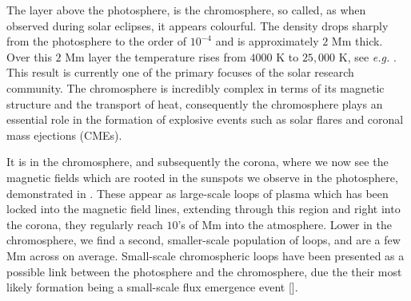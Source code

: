 The layer above the photosphere, is the chromosphere, so called, as when observed during solar eclipses, it appears colourful.
The density drops sharply from the photosphere to the order of $10^{-4}$ and is approximately $2$ Mm thick. 
Over this $2$ Mm layer the temperature rises from $4000$ K to $25,000$ K, see \emph{e.g.} \cite{Withrobe1977}.
This result is currently one of the primary focuses of the solar research community.
The chromosphere is incredibly complex in terms of its magnetic structure and the transport of heat, consequently the chromosphere plays an essential role in the formation of explosive events such as solar flares and coronal mass ejections (CMEs).

It is in the chromosphere, and subsequently the corona, where we now see the magnetic fields which are rooted in the sunspots we observe in the photosphere, demonstrated in \cite{Athay1976}.
These appear as large-scale loops of plasma which has been locked into the magnetic field lines, extending through this region and right into the corona, they regularly reach $10$'s of Mm into the atmosphere.
Lower in the chromosphere, we find a second, smaller-scale population of loops, and are a few Mm across on average.
Small-scale chromospheric loops have been presented as a possible link between the photosphere and the chromosphere, due the their most likely formation being a small-scale flux emergence event [\cite{Ulmschneider1982}].


